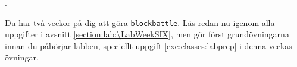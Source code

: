 

\Lab{\LabWeekFIVE}

\begin{Preparations}
\item {}.
\item Du har två veckor på dig att göra \texttt{blockbattle}. Läs redan nu igenom alla uppgifter i avsnitt \ref{section:lab:\LabWeekSIX}, men gör först  grundövningarna innan du påbörjar labben, speciellt uppgift \ref{exe:classes:labprep} i denna veckas övningar.
\end{Preparations}

